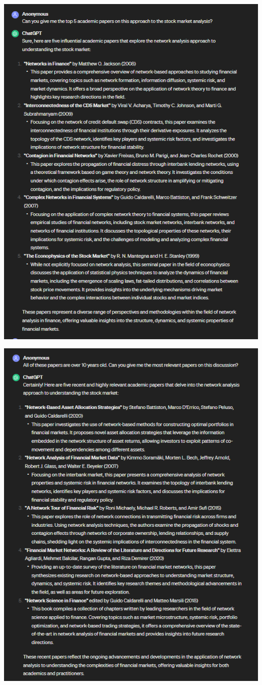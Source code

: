 \documentclass[12pt]{article}
\begin{document}
\includegraphics{prompt3.png}

\includegraphics{prompt4.png}
\end{document}
